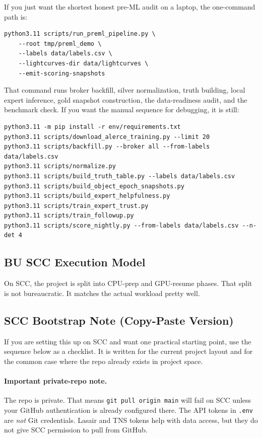 \documentclass[11pt]{article}
\newcommand{\code}[1]{\texttt{#1}}
\begin{document}
If you just want the shortest honest pre-ML audit on a laptop, the one-command path is:

\begin{verbatim}
python3.11 scripts/run_preml_pipeline.py \
    --root tmp/preml_demo \
    --labels data/labels.csv \
    --lightcurves-dir data/lightcurves \
    --emit-scoring-snapshots
\end{verbatim}

That command runs broker backfill, silver normalization, truth building, local expert inference, gold snapshot construction, the data-readiness audit, and the benchmark check. If you want the manual sequence for debugging, it is still:

\begin{verbatim}
python3.11 -m pip install -r env/requirements.txt
python3.11 scripts/download_alerce_training.py --limit 20
python3.11 scripts/backfill.py --broker all --from-labels data/labels.csv
python3.11 scripts/normalize.py
python3.11 scripts/build_truth_table.py --labels data/labels.csv
python3.11 scripts/build_object_epoch_snapshots.py
python3.11 scripts/build_expert_helpfulness.py
python3.11 scripts/train_expert_trust.py
python3.11 scripts/train_followup.py
python3.11 scripts/score_nightly.py --from-labels data/labels.csv --n-det 4
\end{verbatim}

\subsection{BU SCC Execution Model}

On SCC, the project is split into CPU-prep and GPU-resume phases. That split is not bureaucratic. It matches the actual workload pretty well.

\subsection{SCC Bootstrap Note (Copy-Paste Version)}

If you are setting this up on SCC and want one practical starting point, use the sequence below as a checklist. It is written for the current project layout and for the common case where the repo already exists in project space.

\paragraph{Important private-repo note.}
The repo is private. That means \code{git pull origin main} will fail on SCC unless your GitHub authentication is already configured there. The API tokens in \code{.env} are \emph{not} Git credentials. Lasair and TNS tokens help with data access, but they do not give SCC permission to pull from GitHub.
\end{document}
